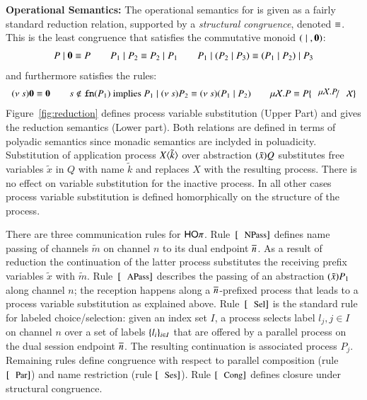 {\bf Operational Semantics:}
The operational semantics for \HOp is given as a fairly standard reduction relation, supported by
a \emph{structural congruence}, denoted $\equiv$. This is 
the least congruence that satisfies the commutative monoid $(\;|\;, \mathbf{0})$:
%
\[
	\begin{array}{c}
		P \;|\; \mathbf{0} \equiv P
		\qquad
		P_1 \;|\; P_2 \equiv P_2 \;|\; P_1
		\qquad
		P_1 \;|\; (P_2 \;|\; P_3) \equiv (P_1 \;|\; P_2) \;|\; P_3
	\end{array}
\]
%
\noi and furthermore satisfies the rules:
%
\[
\begin{array}{c}
	\news{s} \inact \scong \inact
	\qquad
	s \notin \fn{P_1} \textrm{  implies  } P_1 \Par \news{s} P_2 \scong \news{s}(P_1 \Par P_2)
	\qquad
	\recp{X}{P} \scong P\subst{\recp{X}{P}}{\rvar{X}}
\end{array}
\]
%
\noi Figure~\ref{fig:reduction} defines
process variable substitution (Upper Part) and gives the 
reduction semantics (Lower part).
Both relations are defined in terms of polyadic semantics since
monadic semantics are inclyded in poluadicity.
Substitution of application process $X\langle \tilde{k} \rangle$
over abstraction $(\tilde{x})Q$ substitutes free variables
$\tilde{x}$ in $Q$ with name $\tilde{k}$ and replaces
$X$ with the resulting process.
There is no effect on variable substitution for the inactive process.
In all other cases process variable substitution is defined
homorphically on the structure of the process.



There are three communication rules for $\mathsf{HO}\pi$. 
Rule~$\orule{NPass}$ defines name passing 
of channels $\tilde{m}$ on channel $n$ to its dual endpoint $\overline{n}$.
As a result of reduction the continuation of the 
latter process substitutes the receiving prefix variables $\tilde{x}$
with $\tilde{m}$.
Rule~$\orule{APass}$ describes
the passing of an abstraction $(\tilde{x})P_1$
along channel $n$;
the reception happens along a $\overline{n}$-prefixed process that
leads to a process variable substitution as explained above.
Rule~$\orule{Sel}$ is the standard rule for labeled choice/selection:
given an index set $I$, 
a process selects label $l_j, j \in I$ on channel $n$ over a set of
labels $\{l_i\}_{i \in I}$ that are offered by a parallel process
on the dual session endpoint $\overline{n}$.
The resulting continuation is associated process $P_j$.
Remaining rules define congruence 
with respect to parallel composition (rule $\orule{Par}$)
and name restriction (rule $\orule{Ses}$).
Rule $\orule{Cong}$ defines closure under structural congruence.



